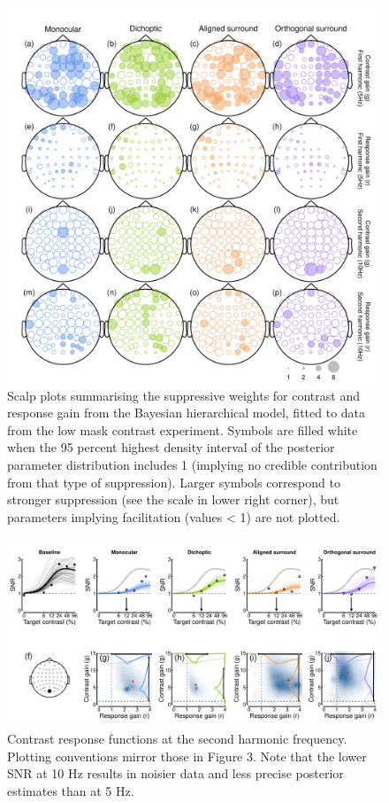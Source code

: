 \documentclass[]{article}
\begin{document}
\begin{figure}

{\centering \includegraphics{figures/modelheads1} 

}

\caption{Scalp plots summarising the suppressive weights for contrast and response gain from the Bayesian hierarchical model, fitted to data from the low mask contrast experiment. Symbols are filled white when the 95 percent highest density interval of the posterior parameter distribution includes 1 (implying no credible contribution from that type of suppression). Larger symbols correspond to stronger suppression (see the scale in lower right corner), but parameters implying facilitation (values < 1) are not plotted.}\label{fig:modelheads1}
\end{figure}

\begin{figure}

{\centering \includegraphics{figures/modelfig2} 

}

\caption{Contrast response functions at the second harmonic frequency. Plotting conventions mirror those in Figure 3. Note that the lower SNR at 10 Hz results in noisier data and less precise posterior estimates than at 5 Hz.}\label{fig:modelfig2}
\end{figure}
\end{document}
